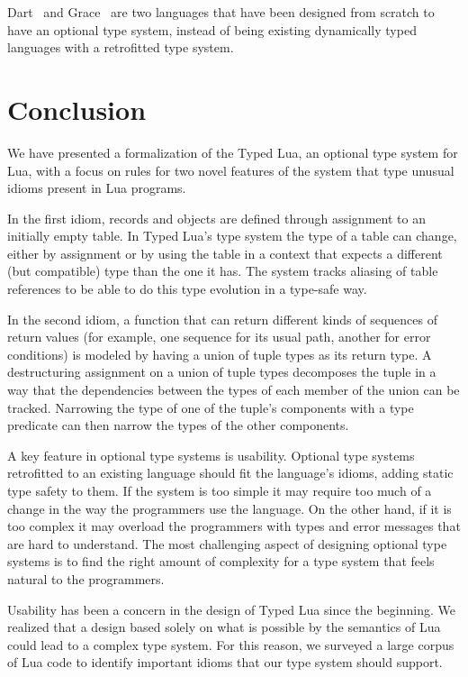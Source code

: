 \documentclass{sigplanconf}
\begin{document}
Dart~\cite{dart} and Grace~\cite{black2013sg} are
two languages that have been designed from scratch
to have an optional type system, instead of being
existing dynamically typed languages with a retrofitted 
type system. 

\section{Conclusion}
\label{sec:conclusion}

We have presented a formalization of the Typed Lua,
an optional type system for Lua, with a focus on rules
for two novel features of the system that type unusual
idioms present in Lua programs.

In the first idiom, records and objects are
defined through assignment to an initially empty
table. In Typed Lua's type system the type of a
table can change, either by assignment
or by using the table in a context that expects
a different (but compatible) type than the one it
has. The system tracks aliasing of table references
to be able to do this type evolution in a type-safe
way.

In the second idiom, a function that can return different
kinds of sequences of return values (for example, one
sequence for its usual path, another for error conditions)
is modeled by having a union of tuple types as its return
type. A destructuring assignment on a union of tuple types
decomposes the tuple in a way that the dependencies between
the types of each member of the union can be tracked.
Narrowing the type of one of the tuple's components with
a type predicate can then narrow the types of the other
components.

A key feature in optional type systems is usability.
Optional type systems retrofitted to an existing
language should fit the language's idioms, adding
static type safety to them. If the system is too
simple it may require too much of a change in the way
the programmers use the language. On the other hand,
if it is too complex it may overload the programmers
with types and error messages that are hard to
understand. The most challenging aspect of designing optional type systems is to find the right amount of complexity for a type system that feels natural to the programmers.

Usability has been a concern in the design of Typed Lua since the beginning. We realized that a design based solely on what
is possible by the semantics of Lua could lead to a 
complex type system. For this reason, we surveyed a large
corpus of Lua code to identify important idioms that
our type system should support.
\end{document}
